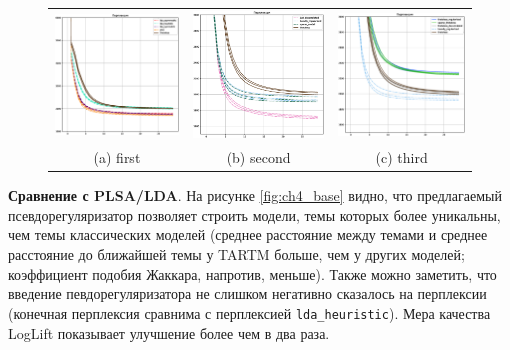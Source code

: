\begin{figure}
\begin{tabular}{ccc}
    \includegraphics[width=55mm]{images/CH4_baselines_PerplexityScore.eps} &   \includegraphics[width=55mm]{images/CH4_vs_regularized_PerplexityScore.eps} & \includegraphics[width=55mm]{images/CH4_improved_PerplexityScore.eps} \\
    (a) first & (b) second & (c) third \\[6pt]
\end{tabular}
\label{fig:Perple3x}
\end{figure}



\textbf{Сравнение с PLSA/LDA}. На рисунке \ref{fig:ch4_base} видно, что предлагаемый псевдорегуляризатор позволяет строить модели, темы которых более уникальны, чем темы классических моделей (среднее расстояние между темами и среднее расстояние до ближайшей темы у TARTM больше, чем у других моделей; коэффициент подобия Жаккара, напротив, меньше). Также можно заметить, что введение певдорегуляризатора не слишком негативно сказалось на перплексии (конечная перплексия сравнима с перплексией \texttt{lda\_heuristic}). Мера качества LogLift показывает улучшение более чем в два раза.

